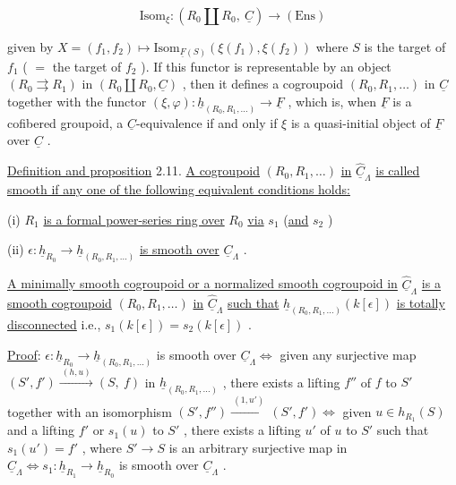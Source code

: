 \begin{equation*}
\mathrm{Isom}_{\xi} : (R_0 \amalg R_0,\ \underline{C}) \to (\mathrm{Ens}) 
\end{equation*}


 given by  $X = (f_1,f_2) \longmapsto \mathrm{Isom}_{\underline{F}(S)}(\xi(f_1),\xi(f_2))$  where  $S$  is the target of  $f_1$ ( $=$ the target of  $f_2$ ). If this functor is representable by an object  $(R_0 \rightrightarrows R_1)$ in  $(R_0 \amalg R_0, \underline{C})$  , then it defines  a cogroupoid  $(R_0,R_1,\ldots)$  in  $\underline{C}$  together with the functor  $(\xi,\varphi) : \underline{h}_{(R_0,R_1,\ldots)} \to \underline{F}$ , which is, when  $\underline{F}$  is a cofibered groupoid, a  $\underline{C}$-equivalence if and only if  $\xi$  is a quasi-initial object of  $\underline{F}$  over  $\underline{C}$ .


\underline{Definition and proposition} 2.11.  \underline{A cogroupoid}  $(R_0,R_1,\ldots)$  \underline{in}  $\hat{\underline{C}}_\Lambda$  \underline{is called smooth if any one of the following equivalent conditions holds:}

 (i)  $R_1$  \underline{is a formal power-series ring over}  $R_0$  \underline{via} $s_1$  (\underline{and}  $s_2$ )

 (ii)  $\epsilon : \underline{h}_{R_0} \longrightarrow \underline{h}_{(R_0,R_1,\ldots)}$  \underline{is smooth over}  $\underline{C}_\Lambda$ .

\underline{A minimally smooth cogroupoid or a normalized smooth cogroupoid in}  $\hat{\underline{C}}_\Lambda$  \underline{is a smooth cogroupoid}  $(R_0,R_1,\ldots)$  \underline{in}  $\hat{\underline{C}}_\Lambda$  \underline{such that}  $\underline{h}_{(R_0,R_1,\ldots)}(k[\epsilon])$  \underline{is totally disconnected} i.e.,  $s_1(k[\epsilon]) = s_2(k[\epsilon])$  .

\underline{Proof}:  $\epsilon : \underline{h}_{R_0} \to \underline{h}_{(R_0,R_1,\ldots)}$  is smooth over  $\underline{C}_\Lambda \Leftrightarrow$ given any surjective map  $(S',f') \xrightarrow{\ (h,u)\ } (S,\ f)$  in  $\underline{h}_{(R_0,R_1,\ldots)}$  , there exists a lifting  $f''$  of  $f$ to  $S'$  together with an isomorphism  $(S',f'') \xrightarrow{\ (1,u')\ } (S',f') \Leftrightarrow$ given  $u \in h_{R_1}(S)$ and a lifting  $f'$  or  $s_1(u)$  to  $S'$  , there exists a lifting  $u'$  of  $u$  to  $S'$ such that  $s_1(u') = f'$  , where  $S' \to S$  is an arbitrary surjective map in $\underline{C}_\Lambda \Leftrightarrow s_1 : \underline{h}_{R_1} \to \underline{h}_{R_0}$  is smooth over  $\underline{C}_\Lambda$ .


